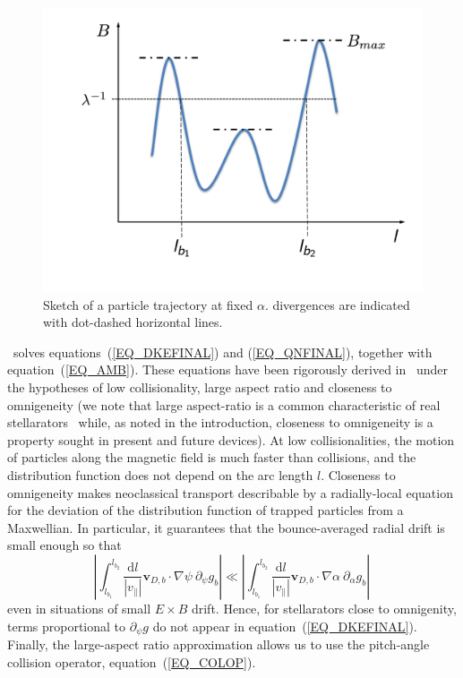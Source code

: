 \begin{figure}
\centering
\includegraphics[angle=0,width=0.6\columnwidth]{figures/B_l}
\caption{Sketch of a particle trajectory at fixed $\alpha$. divergences are indicated with dot-dashed horizontal lines.}
\label{FIG_ORBIT}
\end{figure}

\KNOSOS~solves equations~(\ref{EQ_DKEFINAL}) and (\ref{EQ_QNFINAL}), together with equation~(\ref{EQ_AMB}). These equations have been rigorously derived in~\citep{calvo2018jpp} under the hypotheses of low collisionality, large aspect ratio and closeness to omnigeneity (we note that large aspect-ratio is a common characteristic of real stellarators~\citep{beidler2011icnts} while, as noted in the introduction, closeness to omnigeneity is a property sought in present and future devices). At low collisionalities, the motion of particles along the magnetic field is much faster than collisions, and the distribution function does not depend on the arc length $l$. Closeness to omnigeneity makes neoclassical transport describable by a radially-local equation for the deviation of the distribution function of trapped particles from a Maxwellian. In particular, it guarantees that the bounce-averaged radial drift is small enough so that
\begin{equation}
\left|\int_{l_{b_1}}^{l_{b_2}} \frac{\mathrm{d}l}{|v_\parallel|} \mathbf{v}_{D,b}\cdot\nabla\psi~\partial_\psi g_b\right|\ll
\left|\int_{l_{b_1}}^{l_{b_2}} \frac{\mathrm{d}l}{|v_\parallel|} \mathbf{v}_{D,b}\cdot\nabla\alpha~\partial_\alpha g_b\right|\,
\label{EQ_LOCAL}
\end{equation}
even in situations of small $E\times B$ drift. Hence, for stellarators close to omnigenity, terms proportional to $\partial_\psi g$ do not appear in equation~(\ref{EQ_DKEFINAL}). Finally, the large-aspect ratio approximation allows us to use the pitch-angle collision operator, equation~(\ref{EQ_COLOP}).
 

